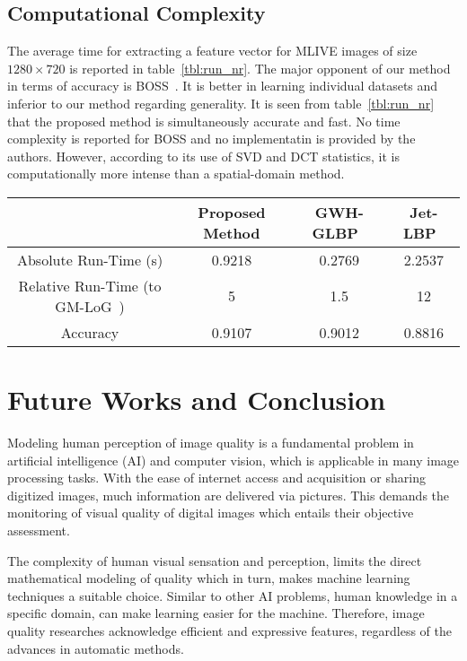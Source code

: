 \subsection{Computational Complexity}
The average time for extracting a feature vector for MLIVE images of size $1280\times 720$ is reported in table~\ref{tbl:run_nr}. The major opponent of our method in terms of accuracy is BOSS~\cite{Zhou2018}. It is better in learning individual datasets and inferior to our method regarding generality. It is seen from table~\ref{tbl:run_nr} that the proposed method is simultaneously accurate and fast. No time complexity is reported for BOSS\cite{Zhou2018} and no implementatin is provided by the authors. However, according to its use of SVD and DCT statistics, it is computationally more intense than a spatial-domain method.
\begin{sidewaystable}[htb]
    \caption{Methods' Time Complexity}
    \label{tbl:run_nr}
  \bigskip
    \centering\footnotesize\setlength\tabcolsep{2pt}
        \hspace*{-1cm}\begin{tabular}{c||c|c|c}
             &Proposed Method&GWH-GLBP~\cite{Li2016}&Jet-LBP~\cite{Hadizadeh2016}
             \\[1ex]
             \hline\hline
             Absolute Run-Time (s)&0.9218&0.2769&2.2537\\[1ex]
             \hline\hline
             Relative Run-Time (to GM-LoG~\cite{xue2014blind})&5&1.5&12\\[1ex]
             \hline\hline
             Accuracy&0.9107&0.9012&0.8816
              \end{tabular}\hspace*{-1cm}
\end{sidewaystable}
\section{Future Works and Conclusion}
Modeling human perception of image quality is a fundamental problem in artificial intelligence (AI) and computer vision, which is applicable in many image processing tasks. With the ease of internet access and acquisition or sharing digitized images, much information are delivered via pictures. This demands the monitoring of visual quality of digital images which entails their objective assessment. 

The complexity of human visual sensation and perception, limits the direct mathematical modeling of quality which in turn, makes machine learning techniques a suitable choice. Similar to other AI problems, human knowledge in a specific domain, can make learning easier for the machine. Therefore, image quality researches acknowledge efficient and expressive features, regardless of the advances in automatic methods.

